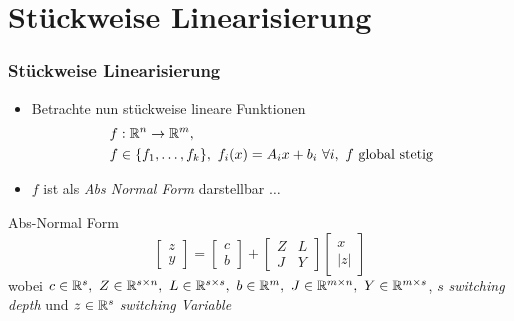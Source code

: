 \section[Problemstellung]{Stückweise Linearisierung}
\begin{frame}[<+->]
\frametitle{Stückweise Linearisierung}
\begin{itemize}
\item Betrachte nun stückweise lineare Funktionen 
\[
\begin{aligned}
 f&:\mathbb R^n \to \mathbb R^m, \\
 f&\in \lbrace f_1,\ldots,f_k\rbrace,~f_i(x)=A_ix+b_i~\forall i,~f \text{ global stetig}
 \end{aligned}
\]
 \item $f$ ist als \textit{Abs Normal Form} darstellbar $\ldots$
 \end{itemize}
\begin{block}{Abs-Normal Form}
 \begin{equation}
\label{eq:absNormalForm}
  \begin{bmatrix}
   z\\y
  \end{bmatrix}
  =
  \begin{bmatrix}
   c\\b
  \end{bmatrix}
  +
  \begin{bmatrix}
   Z & L\\
   J & Y
  \end{bmatrix}
  \begin{bmatrix}
   x\\|z|
  \end{bmatrix}
 \end{equation}
wobei $c\in \mathbb R^s, ~ Z\in \mathbb R^{s\times n},~ L\in\mathbb R^{s\times s}, ~ b\in\mathbb R^m, ~ J\in\mathbb R^{m\times n}, ~ Y\in \mathbb R^{m\times s}$, $s$ \textit{switching depth} und $z\in \mathbb R^s$ \textit{switching Variable}
\end{block}
\end{frame}

